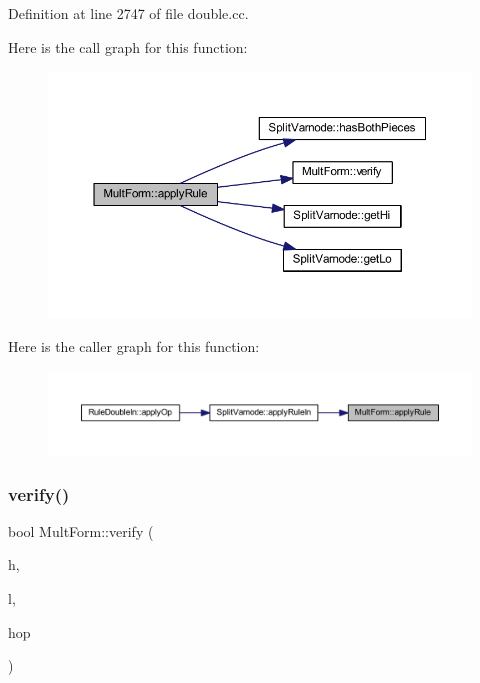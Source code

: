 Definition at line 2747 of file double.\+cc.

Here is the call graph for this function\+:
\nopagebreak
\begin{figure}[H]
\begin{center}
\leavevmode
\includegraphics[width=350pt]{class_mult_form_abd25691ef99e92b5dd28380932bca12d_cgraph}
\end{center}
\end{figure}
Here is the caller graph for this function\+:
\nopagebreak
\begin{figure}[H]
\begin{center}
\leavevmode
\includegraphics[width=350pt]{class_mult_form_abd25691ef99e92b5dd28380932bca12d_icgraph}
\end{center}
\end{figure}
\mbox{\label{class_mult_form_a8426ce4e5ea488cb5e73a5ca2d24673e}} 
\subsubsection{\texorpdfstring{verify()}{verify()}}
{\footnotesize\ttfamily bool Mult\+Form\+::verify (\begin{DoxyParamCaption}\item[{\mbox{\hyperlink{class_varnode}{Varnode}} $\ast$}]{h,  }\item[{\mbox{\hyperlink{class_varnode}{Varnode}} $\ast$}]{l,  }\item[{\mbox{\hyperlink{class_pcode_op}{Pcode\+Op}} $\ast$}]{hop }\end{DoxyParamCaption})}



